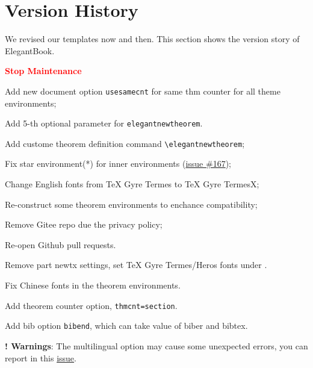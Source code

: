 \documentclass[11pt,bibend=bibtex]{elegantbook}
\begin{document}
\chapter{Version History}
We revised our templates now and then. This section shows the version story of ElegantBook.


  \textcolor{red}{\bfseries Stop Maintenance}

\begin{change}
  \item Add new document option \lstinline|usesamecnt| for same thm counter for all theme environments;
  \item Add 5-th optional parameter for \lstinline|elegantnewtheorem|.
\end{change}



\begin{change}
  \item Add custome theorem definition command \lstinline{\elegantnewtheorem};
  \item Fix star environment(*) for inner environments (\href{https://github.com/ElegantLaTeX/ElegantBook/issues/167}{issue \#167});
  \item Change English fonts from TeX Gyre Termes to TeX Gyre TermesX;
  \item Re-construct some theorem environments to enchance compatibility;
  \item Remove Gitee repo due the privacy policy;
  \item Re-open Github pull requests.
\end{change}





\begin{change}
  \item Remove part newtx settings, set TeX Gyre Termes/Heros fonts under .
  \item Fix Chinese fonts in the theorem environments.
  \item Add theorem counter option, \lstinline{thmcnt=section}.
  \item Add bib option \lstinline{bibend}, which can take value of biber and bibtex.
  \item \textbf{! Warnings}: The multilingual option may cause some unexpected errors, you can report in this \href{https://github.com/ElegantLaTeX/ElegantBook/issues/170}{issue}.
\end{change}
\end{document}
